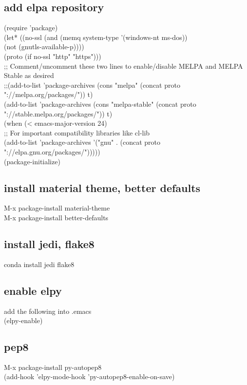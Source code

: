 \documentclass[11pt]{article}
\begin{document}
\subsection{add elpa repository}
\label{sec:orge428813}
(require 'package)\\
(let* ((no-ssl (and (memq system-type '(windows-nt ms-dos))\\
                    (not (gnutls-available-p))))\\
       (proto (if no-ssl "http" "https")))\\
  ;; Comment/uncomment these two lines to enable/disable MELPA and MELPA Stable as desired\\
  ;;(add-to-list 'package-archives (cons "melpa" (concat proto "://melpa.org/packages/")) t)\\
  (add-to-list 'package-archives (cons "melpa-stable" (concat proto "://stable.melpa.org/packages/")) t)\\
  (when (< emacs-major-version 24)\\
    ;; For important compatibility libraries like cl-lib\\
    (add-to-list 'package-archives '("gnu" . (concat proto "://elpa.gnu.org/packages/")))))\\
(package-initialize)\\


\subsection{install material theme, better defaults}
\label{sec:orgf866a37}
M-x package-install material-theme\\
M-x package-install better-defaults\\

\subsection{install jedi, flake8}
\label{sec:orga53940b}
conda install jedi flake8\\


\subsection{enable elpy}
\label{sec:orgbb4e16d}
add the following into .emacs\\
(elpy-enable)\\


\subsection{pep8}
\label{sec:org2afa46e}
M-x package-install py-autopep8\\
(add-hook 'elpy-mode-hook 'py-autopep8-enable-on-save)\\
\end{document}
